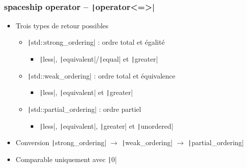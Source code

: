 \documentclass[C++.tex]{subfiles}
\begin{document}
\begin{frame}[fragile]
	\frametitle{spaceship operator -- \texttt|operator<=>|}
	\begin{itemize}
		\item Trois types de retour possibles
		\begin{itemize}
			\item \texttt|std::strong_ordering| : ordre total et égalité
			\begin{itemize}
				\item \texttt|less|, \texttt|equivalent|/\texttt|equal| et \texttt|greater|
			\end{itemize}
			\item \texttt|std::weak_ordering| : ordre total et équivalence
			\begin{itemize}
				\item \texttt|less|, \texttt|equivalent| et \texttt|greater|
			\end{itemize}
			\item \texttt|std::partial_ordering| : ordre partiel
			\begin{itemize}
				\item \texttt|less|, \texttt|equivalent|, \texttt|greater| et \texttt|unordered|
			\end{itemize}
		\end{itemize}
		\item Conversion \texttt|strong_ordering| $\rightarrow$ \texttt|weak_ordering| $\rightarrow$ \texttt|partial_ordering|
		\item Comparable uniquement avec \texttt|0|
	\end{itemize}
\end{frame}
\end{document}
